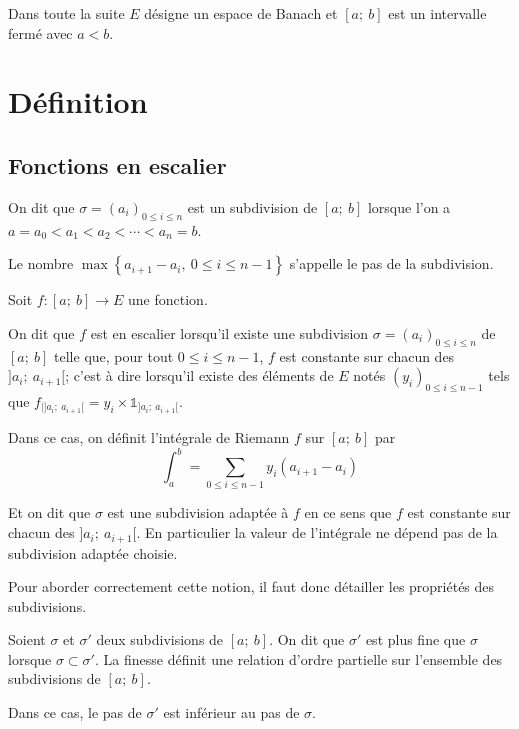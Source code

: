 

Dans toute la suite $E$ désigne un espace de Banach et $[a;~b]$ est un intervalle fermé avec $a<b$.

\section{Définition}

\subsection{Fonctions en escalier}


\begin{de}
On dit que $\sigma = (a_i)_{0 \leq i \leq n}$ est un subdivision de $[a;~b]$ lorsque l'on a $a = a_0 < a_1 < a_2 < \cdots < a_n = b$.

Le nombre $\max\left\{a_{i+1}-a_i,~0\leq i \leq n-1\right\}$ s'appelle le pas de la subdivision.
\end{de}


\begin{de}
Soit $f: [a;~b] \to E$ une fonction.

On dit que $f$ est en escalier lorsqu'il existe une subdivision $\sigma = (a_i)_{0 \leq i \leq n}$ de $[a;~b]$ telle que, pour tout $0 \leq i \leq n-1$, $f$ est constante sur chacun des $]a_i;~a_{i+1}[$; c'est à dire lorsqu'il existe des éléments de $E$ notés $\left(y_i\right)_{0 \leq i \leq n-1}$ tels que $f_{|]a_i;~a_{i+1}[} = y_i \times \mathbb{1}_{]a_i;~a_{i+1}[}$.

Dans ce cas, on définit l'intégrale de Riemann $f$ sur $[a;~b]$ par
\[
\displaystyle{\int_a^b}  = \displaystyle{\sum \limits_{0 \leq i \leq n-1}} y_i(a_{i+1}-a_i)
\]

Et on dit que $\sigma$ est une subdivision adaptée à $f$ en ce sens que $f$ est constante sur chacun des $]a_i;~a_{i+1}[$. En particulier la valeur de l'intégrale ne dépend pas de la subdivision adaptée choisie.
\end{de}

Pour aborder correctement cette notion, il faut donc détailler les propriétés des subdivisions.

\begin{de}
Soient $\sigma$ et $\sigma'$ deux subdivisions de $[a;~b]$. On dit que $\sigma'$ est plus fine que $\sigma$ lorsque $\sigma \subset \sigma'$. La finesse définit une relation d'ordre partielle sur l'ensemble des subdivisions de $[a;~b]$.

Dans ce cas, le pas de $\sigma'$ est inférieur au pas de $\sigma$.
\end{de}


